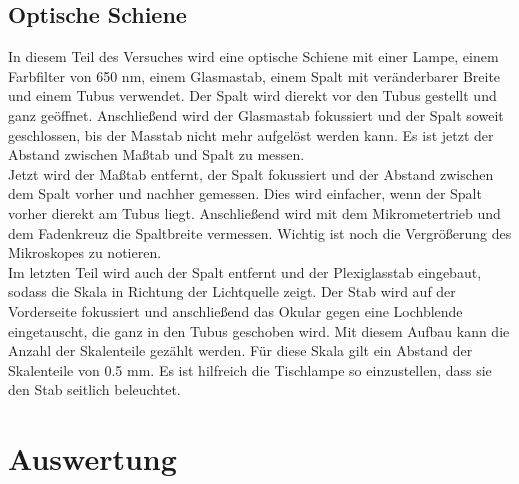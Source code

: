 \documentclass[12pt,a4paper,titlepage,headinclude]{scrartcl}
\numberwithin{equation}{subsection}
\begin{document}
\subsection{Optische Schiene}
In diesem Teil des Versuches wird eine optische Schiene mit einer Lampe, einem Farbfilter von 650 \si{\nano\meter}, einem Glasmastab, einem Spalt mit veränderbarer Breite und einem Tubus verwendet.
Der Spalt wird dierekt vor den Tubus gestellt und ganz geöffnet.
Anschließend wird der Glasmastab fokussiert und der Spalt soweit geschlossen, bis der Masstab nicht mehr aufgelöst werden kann.
Es ist jetzt der Abstand zwischen Maßtab und Spalt zu messen.\\
Jetzt wird der Maßtab entfernt, der Spalt fokussiert und der Abstand zwischen dem Spalt vorher und nachher gemessen.
Dies wird einfacher, wenn der Spalt vorher dierekt am Tubus liegt.
Anschließend wird mit dem Mikrometertrieb und dem Fadenkreuz die Spaltbreite vermessen.
Wichtig ist noch die Vergrößerung des Mikroskopes zu notieren.\\
Im letzten Teil wird auch der Spalt entfernt und der Plexiglasstab eingebaut, sodass die Skala in Richtung der Lichtquelle zeigt.
Der Stab wird auf der Vorderseite fokussiert und anschließend das Okular gegen eine Lochblende eingetauscht, die ganz in den Tubus geschoben wird.
Mit diesem Aufbau kann die Anzahl der Skalenteile gezählt werden.
Für diese Skala gilt ein Abstand der Skalenteile von 0.5 \si{\milli\meter}.
Es ist hilfreich die Tischlampe so einzustellen, dass sie den Stab seitlich beleuchtet.

\section{Auswertung}
\label{sec:auswertung}
\end{document}
